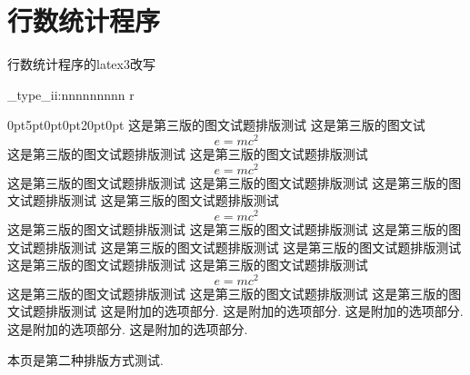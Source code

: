 \documentclass[a4paper,fontset = windowsnew]{ctexbook}
\begin{document}
\chapter{行数统计程序}

\parindent=0pt


行数统计程序的latex3改写

\ExplSyntaxOn

      \cexam_type_ii:nnnnnnnnn 
      {r}
      {
      }
      {0pt}{5pt}{0pt}{0pt}{20pt}{0pt}    
    {
	这是第三版的图文试题排版测试
	这是第三版的图文试
	\begin{equation}
	  e=mc^2
	\end{equation}
	这是第三版的图文试题排版测试
	这是第三版的图文试题排版测试
	\begin{equation}
	  e=mc^2
	\end{equation}
	这是第三版的图文试题排版测试
	这是第三版的图文试题排版测试
	这是第三版的图文试题排版测试
	这是第三版的图文试题排版测试
	\begin{equation}
	  e=mc^2
	\end{equation}
	这是第三版的图文试题排版测试
	这是第三版的图文试题排版测试
	这是第三版的图文试题排版测试
	这是第三版的图文试题排版测试
	这是第三版的图文试题排版测试
	这是第三版的图文试题排版测试
	这是第三版的图文试题排版测试
	\begin{equation}
	  e=mc^2
	\end{equation}
	这是第三版的图文试题排版测试
	这是第三版的图文试题排版测试
	这是第三版的图文试题排版测试
      }
      \newline
      这是附加的选项部分.
      这是附加的选项部分.
      这是附加的选项部分.
      这是附加的选项部分.
      这是附加的选项部分.

    \newpage
    本页是第二种排版方式测试. 

    \par
\end{document}

